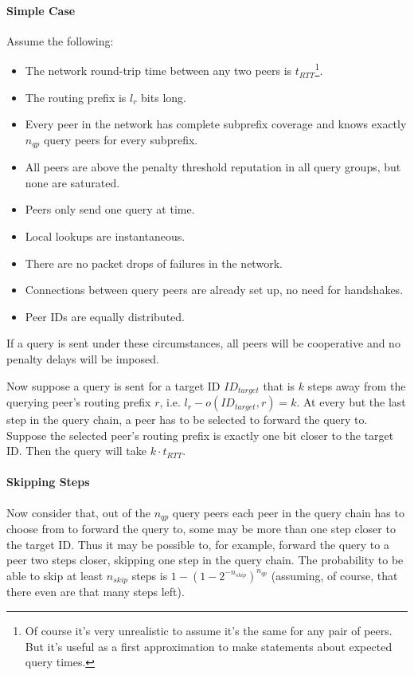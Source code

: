 \paragraph{Simple Case}
Assume the following:

\begin{itemize}
\item The network round-trip time between any two peers is
$t_{RTT}$\footnote{Of course it's very unrealistic to assume it's the same for
any pair of peers. But it's useful as a first approximation to make statements
about expected query times.}.
\item The routing prefix is $l_{r}$ bits long.
\item Every peer in the network has complete subprefix coverage and knows
exactly $n_{qp}$ query peers for every subprefix.
\item All peers are above the penalty threshold reputation in all query groups,
but none are saturated.
\item Peers only send one query at time.
\item Local lookups are instantaneous.
\item There are no packet drops of failures in the network.
\item Connections between query peers are already set up, no need for
handshakes.
\item Peer IDs are equally distributed.
\end{itemize}

If a query is sent under these circumstances, all peers will be cooperative and
no penalty delays will be imposed.

Now suppose a query is sent for a target ID $ID_{target}$ that is $k$ steps away
from the querying peer's routing prefix $r$, i.e. $l_{r} - o(ID_{target}, r) =
k$. At every but the last step in the query chain, a peer has to be selected to
forward the query to. Suppose the selected peer's routing prefix is exactly one
bit closer to the target ID. Then the query will take $k \cdot t_{RTT}$.

\paragraph{Skipping Steps}
Now consider that, out of the $n_{qp}$ query peers each peer in the query chain
has to choose from to forward the query to, some may be more than one step
closer to the target ID. Thus it may be possible to, for example, forward the
query to a peer two steps closer, skipping one step in the query chain. The
probability to be able to skip at least $n_{skip}$ steps is $1 - (1 -
2^{-n_{skip}})^{n_{qp}}$ (assuming, of course, that there even are that many
steps left).

